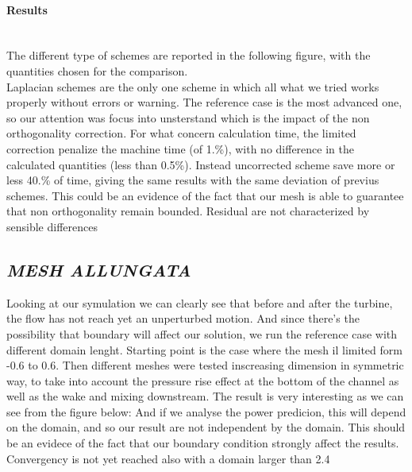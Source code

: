 \documentclass[a4paper,12pt]{article}
\begin{document}
\paragraph{Results} \mbox{}\\
The different type of schemes are reported in the following figure, with the quantities chosen for the comparison. 
\\Laplacian schemes are the only one scheme in which all what we tried works properly without errors or warning. The reference case is the most advanced one, so our attention was focus into unsterstand which is the impact of the non orthogonality correction. For what concern calculation time, the limited correction penalize the machine time (of 1.\%), with no difference in the calculated quantities (less than 0.5\%). Instead uncorrected scheme save more or less 40.\% of time, giving the same results with the same deviation of previus schemes. This could be an evidence of the fact that our mesh is able to guarantee that non orthogonality remain bounded. Residual are not characterized by sensible differences


\subsection{\textit{MESH ALLUNGATA}}
Looking at our symulation we can clearly see that before and after the turbine, the flow has not reach yet an unperturbed motion. And since there's the possibility that boundary will affect our solution, we run the reference case with different domain lenght. Starting point is the case where the mesh il limited form -0.6 to 0.6. Then different meshes were tested inscreasing dimension in symmetric way, to take into account the pressure rise effect at the bottom of the channel as well as the wake and mixing downstream. The result is very interesting as we can see from the figure below:
And if we analyse the power predicion, this will depend on the domain, and so our result are not independent by the domain. This should be an evidece of the fact that our boundary condition strongly affect the results.
Convergency is not yet reached also with a domain larger than 2.4 %



\end{document}
